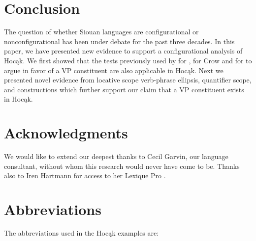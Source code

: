 \documentclass[output=paper]{LSP/langsci}
\begin{document}
\section{Conclusion}\label{sec:jrs:5}
 
The question of whether Siouan languages are configurational or nonconfigurational has been under debate for the past three decades. In this paper, we have presented new evidence to support a configurational analysis of Hocąk.  We first showed that the tests previously used by \citet{Boyle2007} for , \citet{Graczyk1991a} for Crow and \citet{West2003} for  to argue in favor of a VP constituent are also applicable in Hocąk.  Next we presented novel evidence from locative scope verb-phrase ellipsis, quantifier scope, and  constructions which further support our claim that a VP constituent exists in Hocąk. 
 

\section*{Acknowledgments}
We would like to extend our deepest thanks to Cecil Garvin, our language consultant, without whom this research would never have come to be. Thanks also to Iren Hartmann for access to her Lexique Pro .

\section*{Abbreviations}
 
The abbreviations used in the Hocąk examples are: 
\end{document}

